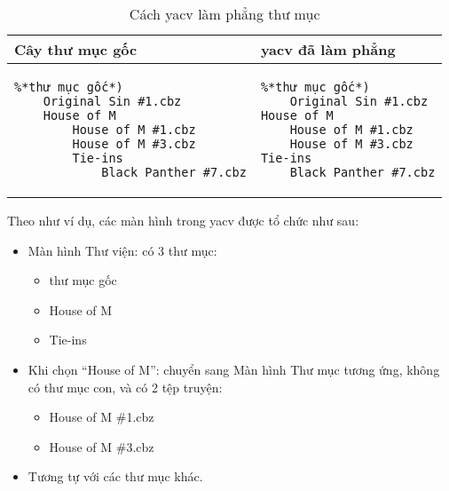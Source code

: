 \documentclass[../../thesis]{subfiles}
\begin{document}

\begin{table}
    \centering
    \caption{Cách yacv làm phẳng thư mục}
    \label{tab:yacv-flattening}
    \begin{tabular}{ll}
        \toprule
        Cây thư mục gốc & yacv đã làm phẳng \\
        \midrule
        \begin{lstlisting}
%*thư mục gốc*)
    Original Sin #1.cbz
    House of M
        House of M #1.cbz
        House of M #3.cbz
        Tie-ins
            Black Panther #7.cbz
        \end{lstlisting}
        &
        \begin{lstlisting}
%*thư mục gốc*)
    Original Sin #1.cbz
House of M
    House of M #1.cbz
    House of M #3.cbz
Tie-ins
    Black Panther #7.cbz
        \end{lstlisting}
        \\
        \bottomrule
    \end{tabular}
\end{table}

Theo như ví dụ, các màn hình trong yacv được tổ chức như sau:

\begin{itemize}
    \item
        Màn hình Thư viện: có 3 thư mục:

        \begin{itemize}
            \item
                thư mục gốc
            \item
                House of M
            \item
                Tie-ins
        \end{itemize}
    \item
        Khi chọn ``House of M'': chuyển sang Màn hình Thư mục tương ứng, không
        có thư mục con, và có 2 tệp truyện:

        \begin{itemize}
            \item
                House of M \#1.cbz
            \item
                House of M \#3.cbz
        \end{itemize}
    \item
        Tương tự với các thư mục khác.
\end{itemize}
\end{document}
